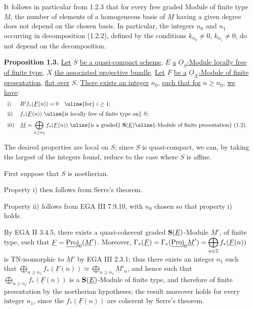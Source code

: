 %
It follows in particular from 1.2.3 that for every free graded Module of finite type \(\underline{M}\), the number of elements of a homogeneous basis of \(\underline{M}\) having a given degree does not depend on the chosen basis. In particular, the integers \(n_0\) and \(n_1\) occurring in decomposition (1.2.2), defined by the conditions \(k_{n_0}\neq0\), \(k_{n_1}\neq0\), do not depend on the decomposition.

\textbf{Proposition 1.3.} \uline{Let} \(S\) \uline{be a quasi-compact scheme}, \(\underline{E}\) \uline{a} \(\underline{O}_S\)\uline{-Module locally free of finite type}, \(X\) \uline{the associated projective bundle}. \uline{Let} \(\underline{F}\) \uline{be a} \(\underline{O}_X\)\uline{-Module of finite presentation}, \uline{flat over} \(S\). \uline{There exists an integer} \(n_0\), \uline{such that for} \(n\geq n_0\), \uline{we have}:
\[
\begin{array}{ll}
\text{i)}& R^i f_*(\underline{F}(n))=0\quad\text{\uline{for} }i\geq 1;\\[2mm]
\text{ii)}& f_*(\underline{F}(n))\text{ \uline{is locally free of finite type on} }S;\\[2mm]
\text{iii)}& \underline{M}=\displaystyle\bigoplus_{n\geq n_0} f_*(\underline{F}(n))\text{ \uline{is a graded} }\Sym(\underline{E})\text{\uline{-Module of finite presentation} (1.2).}
\end{array}
\]

The desired properties are local on \(S\); since \(S\) is quasi-compact, we can, by taking the largest of the integers found, reduce to the case where \(S\) is affine.

First suppose that \(S\) is noetherian.

Property i) then follows from Serre's theorem.

Property ii) follows from EGA III 7.9.10, with \(n_0\) chosen so that property i) holds.

By EGA II 3.4.5, there exists a quasi-coherent graded \(\mathbf{S}(\underline{E})\)-Module \(\underline{M}'\), of finite type, such that \(\underline{F}=\underline{\operatorname{Proj}}_0(\underline{M}')\). Moreover, \(\Gamma_*(\underline{F})=\Gamma_*(\underline{\operatorname{Proj}}_0 \underline{M}')=\displaystyle\bigoplus_{n\in\mathbb Z} f_*(\underline{F}(n))\) is TN-isomorphic to \(\underline{M}'\) by EGA III 2.3.1; thus there exists an integer \(n_1\) such that \(\displaystyle\bigoplus_{n\geq n_1} f_*(\underline{F}(n))\simeq \bigoplus_{n\geq n_1} \underline{M}'_n\),
%
and hence such that \(\bigoplus_{n\geq n_1} f_*(\underline{F}(n))\) is a \(\mathbf{S}(\underline{E})\)-Module of finite type, and therefore of finite presentation by the noetherian hypotheses; the result moreover holds for every integer \(n_1\), since the \(f_*(\underline{F}(n))\) are coherent by Serre's theorem.

